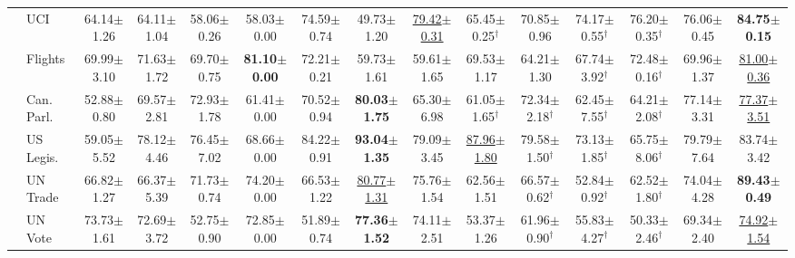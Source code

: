 \begin{table}[t]
{\begin{tabular}{llccccccccccccc}
 & UCI & 64.14{\scriptsize$\pm$1.26} & 64.11{\scriptsize$\pm$1.04} & 58.06{\scriptsize$\pm$0.26} & 58.03{\scriptsize$\pm$0.00} & 74.59{\scriptsize$\pm$0.74} & 49.73{\scriptsize$\pm$1.20} & \underline{79.42{\scriptsize$\pm$0.31}} & 65.45{\scriptsize$\pm$0.25}$^\dagger$ & 70.85{\scriptsize$\pm$0.96} & 74.17{\scriptsize$\pm$0.55}$^\dagger$ & 76.20{\scriptsize$\pm$0.35}$^\dagger$ & 76.06{\scriptsize$\pm$0.45} & \textbf{84.75{\scriptsize$\pm$0.15}} \\
 & Flights & 69.99{\scriptsize$\pm$3.10} & 71.63{\scriptsize$\pm$1.72} & 69.70{\scriptsize$\pm$0.75} & \textbf{81.10{\scriptsize$\pm$0.00}} & 72.21{\scriptsize$\pm$0.21} & 59.73{\scriptsize$\pm$1.61} & 59.61{\scriptsize$\pm$1.65} & 69.53{\scriptsize$\pm$1.17} & 64.21{\scriptsize$\pm$1.30} & 67.74{\scriptsize$\pm$3.92}$^\dagger$ & 72.48{\scriptsize$\pm$0.16}$^\dagger$ & 69.96{\scriptsize$\pm$1.37} & \underline{81.00{\scriptsize$\pm$0.36}} \\
 & Can. Parl. & 52.88{\scriptsize$\pm$0.80} & 69.57{\scriptsize$\pm$2.81} & 72.93{\scriptsize$\pm$1.78} & 61.41{\scriptsize$\pm$0.00} & 70.52{\scriptsize$\pm$0.94} & \textbf{80.03{\scriptsize$\pm$1.75}} & 65.30{\scriptsize$\pm$6.98} & 61.05{\scriptsize$\pm$1.65}$^\dagger$ & 72.34{\scriptsize$\pm$2.18}$^\dagger$ & 62.45{\scriptsize$\pm$7.55}$^\dagger$ & 64.21{\scriptsize$\pm$2.08}$^\dagger$ & 77.14{\scriptsize$\pm$3.31} & \underline{77.37{\scriptsize$\pm$3.51}} \\
 & US Legis. & 59.05{\scriptsize$\pm$5.52} & 78.12{\scriptsize$\pm$4.46} & 76.45{\scriptsize$\pm$7.02} & 68.66{\scriptsize$\pm$0.00} & 84.22{\scriptsize$\pm$0.91} & \textbf{93.04{\scriptsize$\pm$1.35}} & 79.09{\scriptsize$\pm$3.45} & \underline{87.96{\scriptsize$\pm$1.80}} & 79.58{\scriptsize$\pm$1.50}$^\dagger$ & 73.13{\scriptsize$\pm$1.85}$^\dagger$ & 65.75{\scriptsize$\pm$8.06}$^\dagger$ & 79.79{\scriptsize$\pm$7.64} & 83.74{\scriptsize$\pm$3.42} \\
 & UN Trade & 66.82{\scriptsize$\pm$1.27} & 66.37{\scriptsize$\pm$5.39} & 71.73{\scriptsize$\pm$0.74} & 74.20{\scriptsize$\pm$0.00} & 66.53{\scriptsize$\pm$1.22} & \underline{80.77{\scriptsize$\pm$1.31}} & 75.76{\scriptsize$\pm$1.54} & 62.56{\scriptsize$\pm$1.51} & 66.57{\scriptsize$\pm$0.62}$^\dagger$ & 52.84{\scriptsize$\pm$0.92}$^\dagger$ & 62.52{\scriptsize$\pm$1.80}$^\dagger$ & 74.04{\scriptsize$\pm$4.28} & \textbf{89.43{\scriptsize$\pm$0.49}} \\
 & UN Vote & 73.73{\scriptsize$\pm$1.61} & 72.69{\scriptsize$\pm$3.72} & 52.75{\scriptsize$\pm$0.90} & 72.85{\scriptsize$\pm$0.00} & 51.89{\scriptsize$\pm$0.74} & \textbf{77.36{\scriptsize$\pm$1.52}} & 74.11{\scriptsize$\pm$2.51} & 53.37{\scriptsize$\pm$1.26} & 61.96{\scriptsize$\pm$0.90}$^\dagger$ & 55.83{\scriptsize$\pm$4.27}$^\dagger$ & 50.33{\scriptsize$\pm$2.46}$^\dagger$ & 69.34{\scriptsize$\pm$2.40} & \underline{74.92{\scriptsize$\pm$1.54}} \\

\end{tabular}}
\end{table}
